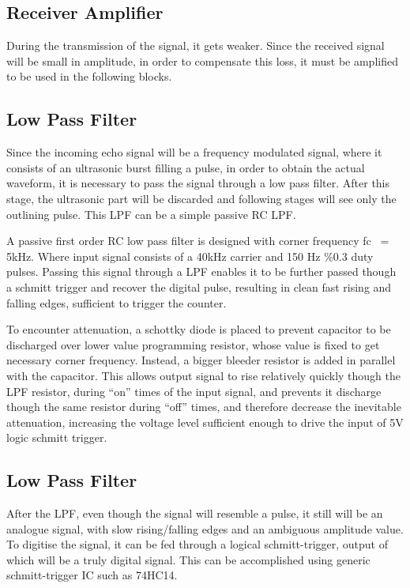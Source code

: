 \documentclass[12pt, a4paper]{article}
\begin{document}
	\subsection{Receiver Amplifier}
	During the transmission of the signal, it gets weaker. Since the received signal will be small in amplitude, in order to compensate this loss, it must be amplified to be used in the following blocks.
	
	\subsection{Low Pass Filter}
	Since the incoming echo signal will be a frequency modulated signal, where it consists of an ultrasonic burst filling a pulse, in order to obtain the actual waveform, it is necessary to pass the signal through a low pass filter. After this stage, the ultrasonic part will be discarded and following stages will see only the outlining pulse. This LPF can be a simple passive RC LPF.
	
	A passive first order RC low pass filter is designed with corner frequency fc ~= 5kHz. Where input signal consists of a 40kHz carrier and 150 Hz \%0.3 duty pulses. Passing this signal through a LPF enables it to be further passed though a schmitt trigger and recover the digital pulse, resulting in clean fast rising and falling edges, sufficient to trigger the counter.

To encounter attenuation, a schottky diode is placed to prevent capacitor to be discharged over lower value programming resistor, whose value is fixed to get necessary corner frequency. Instead, a bigger bleeder resistor is added in parallel with the capacitor. This allows output signal to rise relatively quickly though the LPF resistor, during “on” times of the input signal, and prevents it discharge though the same resistor during “off” times, and therefore decrease the inevitable attenuation, increasing the voltage level sufficient enough to drive the input of 5V logic schmitt trigger.
	
	\subsection{Low Pass Filter}
	After the LPF, even though the signal will resemble a pulse, it still will be an analogue signal, with slow rising/falling edges and an ambiguous amplitude value. To digitise the signal, it can be fed through a logical schmitt-trigger, output of which will be a truly digital signal. This can be accomplished using generic schmitt-trigger IC such as 74HC14.
\end{document}
